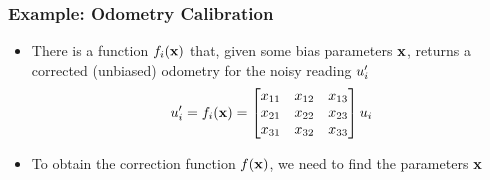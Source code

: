 \begin{frame}
    \frametitle{Example: Odometry Calibration}
    
    \begin{itemize}
        \item There is a function $f_{i}(\boldsymbol{\mathbf{x}})$ that, given some bias parameters $\boldsymbol{\mathbf{x}}$, returns a corrected (unbiased) odometry for the noisy reading $u_{i}^{\prime}$ 
        \begin{equation*}
            u_{i}^{\prime} = f_{i}(\boldsymbol{\mathbf{x}}) =
            \begin{bmatrix}
                x_{11} & x_{12} & x_{13} \\
                x_{21} & x_{22} & x_{23} \\
                x_{31} & x_{32} & x_{33}
            \end{bmatrix}
            u_{i}
        \end{equation*}
    \item To obtain the correction function $f(\boldsymbol{\mathbf{x}})$, we need to find the parameters $\boldsymbol{\mathbf{x}}$
    \end{itemize}
    
\end{frame}

